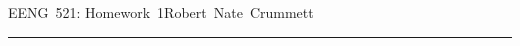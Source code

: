 


\def\qed{\vrule height 6pt width 6pt depth 0pt}
\parindent 0pt
\parskip 2mm


EENG~521: Homework~1\hfill Robert~Nate~Crummett
\smallskip
\hrule







\bye

